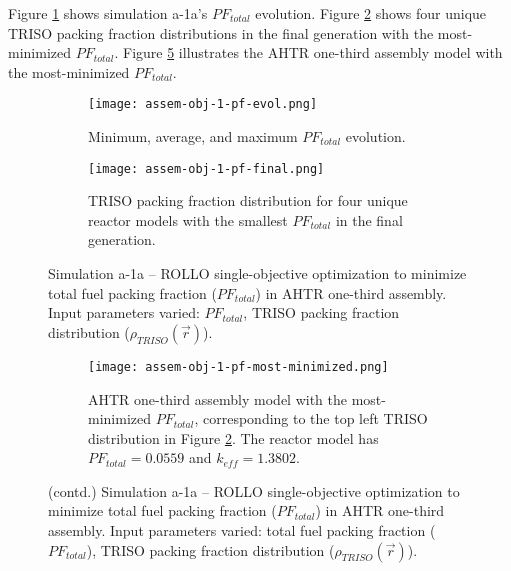 Figure \ref{fig:assem-obj-1-pf-evol} shows simulation a-1a's $PF_{total}$ evolution.
Figure \ref{fig:assem-obj-1-pf-final} shows four unique TRISO packing fraction 
distributions in the final generation with the most-minimized $PF_{total}$. 
Figure \ref{fig:assem-obj-1-pf-most-minimized} illustrates the \gls{AHTR} one-third 
assembly model with the most-minimized $PF_{total}$.
\begin{figure}[htbp!]
    \begin{subfigure}{\textwidth}
        \centering
        \texttt{[image: assem-obj-1-pf-evol.png]}
        \caption{Minimum, average, and maximum $PF_{total}$ evolution.}
        \label{fig:assem-obj-1-pf-evol} 
    \end{subfigure}
    \begin{subfigure}{\textwidth}
        \centering
        \texttt{[image: assem-obj-1-pf-final.png]}
        \caption{TRISO packing fraction distribution for four unique reactor models with the 
        smallest $PF_{total}$ in the final generation.}
        \label{fig:assem-obj-1-pf-final} 
    \end{subfigure}
    \caption{Simulation a-1a -- ROLLO single-objective optimization to minimize total 
    fuel packing fraction ($PF_{total}$) in \gls{AHTR} one-third assembly. 
    Input parameters varied: $PF_{total}$, \gls{TRISO} packing fraction 
    distribution ($\rho_{TRISO}(\vec{r})$).}
    \label{fig:assem-obj-1-pf}
\end{figure}
\begin{figure}[htbp!]
    \ContinuedFloat
    \begin{subfigure}{\textwidth}
        \centering
        \texttt{[image: assem-obj-1-pf-most-minimized.png]}
        \caption{\gls{AHTR} one-third assembly model with the most-minimized 
        $PF_{total}$, corresponding to the top left TRISO distribution in Figure 
        \ref{fig:assem-obj-1-pf-final}. The reactor model has $PF_{total}=0.0559$
        and $k_{eff}=1.3802$.}
        \label{fig:assem-obj-1-pf-most-minimized} 
    \end{subfigure}
    \caption{(contd.) Simulation a-1a -- ROLLO single-objective optimization to minimize total 
    fuel packing fraction ($PF_{total}$) in \gls{AHTR} one-third assembly. 
    Input parameters varied: total fuel packing fraction 
    ($PF_{total}$), \gls{TRISO} packing fraction distribution ($\rho_{TRISO}(\vec{r})$).}
\end{figure}

